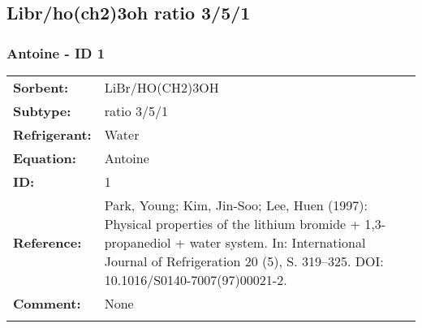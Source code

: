 \subsection{Libr/ho(ch2)3oh  ratio 3/5/1}
%
\subsubsection{Antoine - ID 1}
%
\begin{tabular}[l]{|lp{11.5cm}|}
\hline
\addlinespace

\textbf{Sorbent:} & LiBr/HO(CH2)3OH  \\
\textbf{Subtype:} & ratio 3/5/1 \\
\textbf{Refrigerant:} & Water  \\
\textbf{Equation:} & Antoine \\
\textbf{ID:} & 1 \\
\textbf{Reference:} & Park, Young; Kim, Jin-Soo; Lee, Huen (1997): Physical properties of the lithium bromide + 1,3-propanediol + water system. In: International Journal of Refrigeration 20 (5), S. 319–325. DOI: 10.1016/S0140-7007(97)00021-2. \\
\textbf{Comment:} & None \\

\addlinespace
\hline
\end{tabular}
\newline

